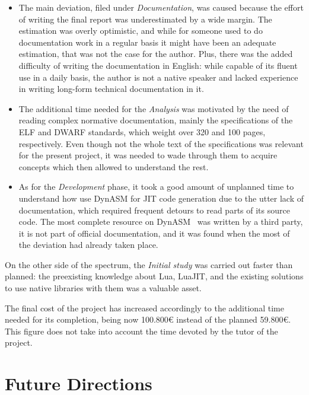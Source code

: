 \begin{itemize}

	\item The main deviation, filed under \emph{Documentation}, was caused
	because the effort of writing the final report was underestimated by
	a wide margin. The estimation was overly optimistic, and while for someone
	used to do documentation work in a regular basis it might have been an
	adequate estimation, that was not the case for the author. Plus, there was
	the added difficulty of writing the documentation in English: while
	capable of its fluent use in a daily basis, the author is not a native
	speaker and lacked experience in writing long-form technical documentation
	in it.

	\item The additional time needed for the \emph{Analysis} was motivated by
	the need of reading complex normative documentation, mainly the
	specifications of the \gls{ELF} and \gls{DWARF} standards, which weight
	over 320 and 100 pages, respectively. Even though not the whole text of
	the specifications was relevant for the present project, it was needed to
	wade through them to acquire concepts which then allowed to understand the
	rest.

	\item As for the \emph{Development} phase, it took a good amount of
	unplanned time to understand how use DynASM for JIT code generation due to
	the utter lack of documentation, which required frequent detours to read
	parts of its source code. The most complete resource on
	DynASM~\cite{unofficial-dasm-doc} was written by a third party, it is not
	part of official documentation, and it was found when the most of the
	deviation had already taken place.

\end{itemize}


On the other side of the spectrum, the \emph{Initial study} was carried out
faster than planned: the preexisting knowledge about Lua, LuaJIT, and the
existing solutions to use native libraries with them was a valuable asset.

The final cost of the project has increased accordingly to the additional time
needed for its completion, being now 100.800€ instead of the planned 59.800€.
This figure does not take into account the time devoted by the tutor of the
project.


\section{Future Directions}

